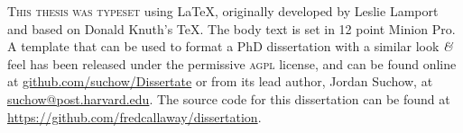 \newpage

\vspace*{200pt}

\begin{center}
\parbox{200pt}{\lettrine[lines=3,slope=-2pt,nindent=-4pt]{\textcolor{SchoolColor}{T}}{his thesis was typeset} using \LaTeX, originally developed by Leslie Lamport and based on Donald Knuth's \TeX. The body text is set in 12 point Minion Pro. A template that can be used to format a PhD dissertation with a similar look \textit{\&} feel has been released under the permissive \textsc{agpl} license, and can be found online at \href{https://github.com/suchow/Dissertate}{github.com/suchow/Dissertate} or from its lead author, Jordan Suchow, at \href{mailto:suchow@post.harvard.edu}{suchow@post.harvard.edu}. The source code for this dissertation can be found at \url{https://github.com/fredcallaway/dissertation}.
} 
\end{center}
